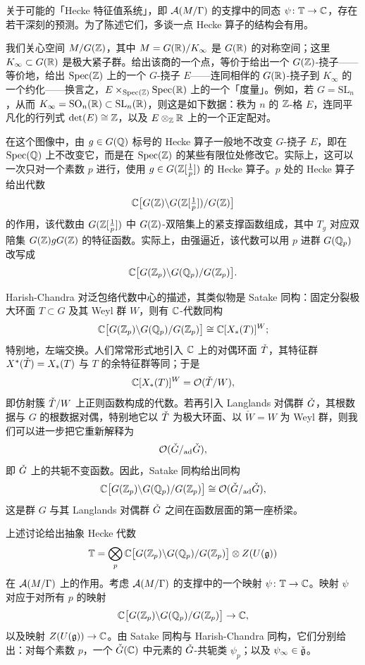 关于可能的「Hecke 特征值系统」，即 $\mathcal{A}(M/\Gamma)$ 的支撑中的同态 $\psi\colon\mathbb{T}\to\mathbb{C}$，存在若干深刻的预测。为了陈述它们，多谈一点 Hecke 算子的结构会有用。

我们关心空间 $M/G(\mathbb{Z})$，其中 $M=G(\mathbb{R})/K_\infty$ 是 $G(\mathbb{R})$ 的对称空间；这里 $K_\infty\subset G(\mathbb{R})$ 是极大紧子群。给出该商的一个点，等价于给出一个 $G(\mathbb{Z})$-挠子——等价地，给出 $\operatorname{Spec}(\mathbb{Z})$ 上的一个 $G$-挠子 $E$——连同相伴的 $G(\mathbb{R})$-挠子到 $K_\infty$ 的一个约化——换言之，$E\times_{\operatorname{Spec}(\mathbb{Z})}\operatorname{Spec}(\mathbb{R})$ 上的一个「度量」。例如，若 $G=\mathrm{SL}_n$，从而 $K_\infty=\mathrm{SO}_n(\mathbb{R})\subset\mathrm{SL}_n(\mathbb{R})$，则这是如下数据：秩为 $n$ 的 $\mathbb{Z}$-格 $E$，连同平凡化的行列式 $\det(E)\cong\mathbb{Z}$，以及 $E\otimes_{\mathbb{Z}}\mathbb{R}$ 上的一个正定配对。

在这个图像中，由 $g\in G(\mathbb{Q})$ 标号的 Hecke 算子一般地不改变 $G$-挠子 $E$，即在 $\operatorname{Spec}(\mathbb{Q})$ 上不改变它，而是在 $\operatorname{Spec}(\mathbb{Z})$ 的某些有限位处修改它。实际上，这可以一次只对一个素数 $p$ 进行，使用 $g\in G(\mathbb{Z}[\frac1p])$ 的 Hecke 算子。$p$ 处的 Hecke 算子给出代数
\[ \mathbb{C}\big[G(\mathbb{Z})\backslash G(\mathbb{Z}[\tfrac1p])/G(\mathbb{Z})\big] \]
的作用，该代数由 $G(\mathbb{Z}[\frac1p])$ 中 $G(\mathbb{Z})$-双陪集上的紧支撑函数组成，其中 $T_g$ 对应双陪集 $G(\mathbb{Z})gG(\mathbb{Z})$ 的特征函数。实际上，由强逼近，该代数可以用 $p$ 进群 $G(\mathbb{Q}_p)$ 改写成
\[ \mathbb{C}\big[G(\mathbb{Z}_p)\backslash G(\mathbb{Q}_p)/G(\mathbb{Z}_p)\big]. \]

Harish-Chandra 对泛包络代数中心的描述，其类似物是 Satake 同构：固定分裂极大环面 $T\subset G$ 及其 Weyl 群 $W$，则有 $\mathbb{C}$-代数同构
\[ \mathbb{C}\big[G(\mathbb{Z}_p)\backslash G(\mathbb{Q}_p)/G(\mathbb{Z}_p)\big]\cong\mathbb{C}[X_*(T)]^W; \]
特别地，左端交换。人们常常形式地引入 $\mathbb{C}$ 上的对偶环面 $\check{T}$，其特征群 $X^*(\check{T})=X_*(T)$ 与 $T$ 的余特征群等同；于是
\[ \mathbb{C}[X_*(T)]^W=\mathcal{O}(\check{T}/W), \]
即仿射簇 $\check{T}/W$ 上正则函数构成的代数。若再引入 Langlands 对偶群 $\check{G}$，其根数据与 $G$ 的根数据对偶，特别地它以 $\check{T}$ 为极大环面、以 $\check W=W$ 为 Weyl 群，则我们可以进一步把它重新解释为
\[ \mathcal{O}(\check{G}/_{\mathrm{ad}}\check{G}), \]
即 $\check{G}$ 上的共轭不变函数。因此，Satake 同构给出同构
\[ \mathbb{C}\big[G(\mathbb{Z}_p)\backslash G(\mathbb{Q}_p)/G(\mathbb{Z}_p)\big]\cong\mathcal{O}(\check{G}/_{\mathrm{ad}}\check{G}), \]
这是群 $G$ 与其 Langlands 对偶群 $\check{G}$ 之间在函数层面的第一座桥梁。

上述讨论给出抽象 Hecke 代数
\[ \mathbb{T}=\bigotimes_{p}\mathbb{C}\big[G(\mathbb{Z}_p)\backslash G(\mathbb{Q}_p)/G(\mathbb{Z}_p)\big]\otimes Z(U(\mathfrak{g})) \]
在 $\mathcal{A}(M/\Gamma)$ 上的作用。考虑 $\mathcal{A}(M/\Gamma)$ 的支撑中的一个映射 $\psi\colon\mathbb{T}\to\mathbb{C}$。映射 $\psi$ 对应于对所有 $p$ 的映射
\[ \mathbb{C}\big[G(\mathbb{Z}_p)\backslash G(\mathbb{Q}_p)/G(\mathbb{Z}_p)\big]\to\mathbb{C}, \]
以及映射 $Z(U(\mathfrak{g}))\to\mathbb{C}$。由 Satake 同构与 Harish-Chandra 同构，它们分别给出：对每个素数 $p$，一个 $\check{G}(\mathbb{C})$ 中元素的 $\check{G}$-共轭类 $\psi_p$；以及 $\psi_\infty\in\check{\mathfrak{g}}$。

